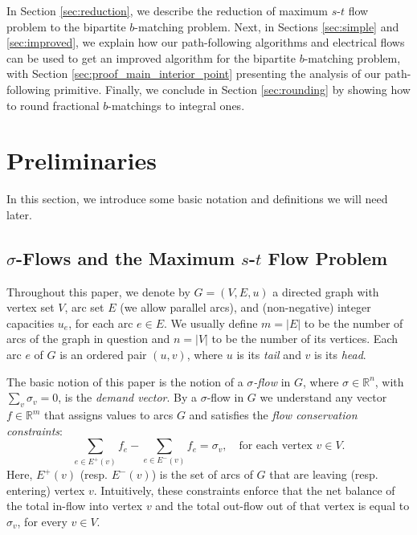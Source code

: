 \documentclass[11pt, letterpaper]{article}
\newcommand{\bbR}{\mathbb{R}}
\newcommand{\vsigma}{\boldsymbol{\mathit{\sigma}}}
\newcommand{\bb}{\boldsymbol{\mathit{b}}}
\newcommand{\ff}{\boldsymbol{\mathit{f}}}
\newcommand{\uu}{\boldsymbol{\mathit{u}}}
\begin{document}
In Section \ref{sec:reduction}, we describe the reduction of maximum $s$-$t$ flow problem to the bipartite $\bb$-matching problem. Next, in Sections \ref{sec:simple} and \ref{sec:improved}, we explain how our path-following algorithms and electrical flows can be used to get an improved algorithm for the bipartite $\bb$-matching problem, with Section \ref{sec:proof_main_interior_point} presenting the analysis of our path-following primitive. Finally, we conclude in Section \ref{sec:rounding} by showing how to round fractional $\bb$-matchings to integral ones.  \section{Preliminaries}\label{sec:preliminaries}

In this section, we introduce some basic notation and definitions we will need later. 

\subsection{\texorpdfstring{$\vsigma$-Flows}{Sigma-Flows} and the Maximum $s$-$t$ Flow Problem}



Throughout this paper, we denote by $G=(V,E,\uu)$ a directed graph with vertex set $V$, arc set $E$ (we allow parallel arcs), and (non-negative) integer capacities $u_e$, for each arc $e\in E$. We usually define $m=|E|$ to be the number of arcs of the graph in question and $n=|V|$ to be the number of its vertices. Each arc $e$ of $G$ is an ordered pair $(u,v)$, where $u$ is its {\em tail} and $v$ is its {\em head}.

The basic notion of this paper is the notion of a {\em $\vsigma$-flow} in $G$, where $\vsigma\in \bbR^n$, with $\sum_v \sigma_v =0$, is the {\em demand vector}. By a $\vsigma$-flow in $G$ we understand any vector $\ff\in \bbR^m$ that assigns values to arcs $G$ and satisfies the {\em flow conservation constraints}:
\begin{equation}\label{eq:conservation_constraints}
\sum_{e\in E^+(v)} f_{e} - \sum_{e\in E^-(v)} f_{e} = \sigma_v, \quad \text{for each vertex $v\in V$}.
\end{equation} 
Here, $E^+(v)$ (resp. $E^-(v)$) is the set of arcs of $G$ that are leaving (resp. entering) vertex $v$. Intuitively, these constraints enforce that the net balance of the total in-flow into vertex $v$ and  the total out-flow out of that vertex is equal to $\sigma_v$, for every $v\in V$. 
\end{document}
